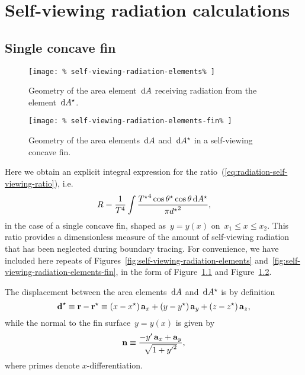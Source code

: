 \chapter{Self-viewing radiation calculations}
\label{ch:self-viewing}

\section{Single concave fin}
\label{sec:self-viewing.fin}

\begin{figure}
  \centering
  \texttt{[image: \%
    self-viewing-radiation-elements\%
  ]}
  \caption{
    Geometry of the area element~$\mathop{}\!\mathrm{d} A$
    receiving radiation from the element~$\mathop{}\!\mathrm{d} A^\star$.
  }
  \label{fig:self-viewing-radiation-elements-appendix}
\end{figure}

\begin{figure}
  \centering
  \texttt{[image: \%
    self-viewing-radiation-elements-fin\%
  ]}
  \caption{
    Geometry of the area elements~$\mathop{}\!\mathrm{d} A$ and~$\mathop{}\!\mathrm{d} A^\star$
    in a self-viewing concave fin.
  }
  \label{fig:self-viewing-radiation-elements-fin-appendix}
\end{figure}

Here we obtain an explicit integral expression
for the ratio~(\ref{eq:radiation-self-viewing-ratio}),
i.e.
\begin{equation}
  R =
    \frac{1}{T^4}
    \int
      \frac{
        {T^\star}^4 \cos\theta^\star \cos\theta \mathop{}\!\mathrm{d} A^\star
      }{
        \pi {d^\star}^2
      },
  \label{eq:radiation-self-viewing-ratio-appendix}
\end{equation}
in the case of a single concave fin,
shaped as~$y = y (x)$ on~$x_1 \le x \le x_2$.
This ratio provides a dimensionless measure
of the amount of self-viewing radiation
that has been neglected during boundary tracing.
For convenience, we have included here
repeats of Figures~\ref{fig:self-viewing-radiation-elements}
and~\ref{fig:self-viewing-radiation-elements-fin},
in the form of Figure~\ref{fig:self-viewing-radiation-elements-appendix}
and Figure~\ref{fig:self-viewing-radiation-elements-fin-appendix}.

The displacement between the area elements~$\mathop{}\!\mathrm{d} A$ and~$\mathop{}\!\mathrm{d} A^\star$ is
by definition
\begin{equation}
  \boldsymbol{\mathbf{d}}^\star
    \equiv
      \boldsymbol{\mathbf{r}} - \boldsymbol{\mathbf{r}}^\star \\
    \equiv
      (x - x^\star) \mathop{}\!\boldsymbol{\mathbf{a}}_{x}
        +
      (y - y^\star) \mathop{}\!\boldsymbol{\mathbf{a}}_{y}
        +
      (z - z^\star) \mathop{}\!\boldsymbol{\mathbf{a}}_{z},
  \label{eq:radiation-self-viewing-displacement-appendix}
\end{equation}
while the normal to the fin surface~$y = y (x)$ is given by
\begin{equation}
  \mathop{}\!\boldsymbol{\mathbf{n}} \equiv
    \frac{
      -y' \mathop{}\!\boldsymbol{\mathbf{a}}_{x} + \mathop{}\!\boldsymbol{\mathbf{a}}_{y}
    }{
      \sqrt{1 + {y'}^2}
    },
  \label{eq:radiation-self-viewing-normal-vector}
\end{equation}
where primes denote $x$-differentiation.

